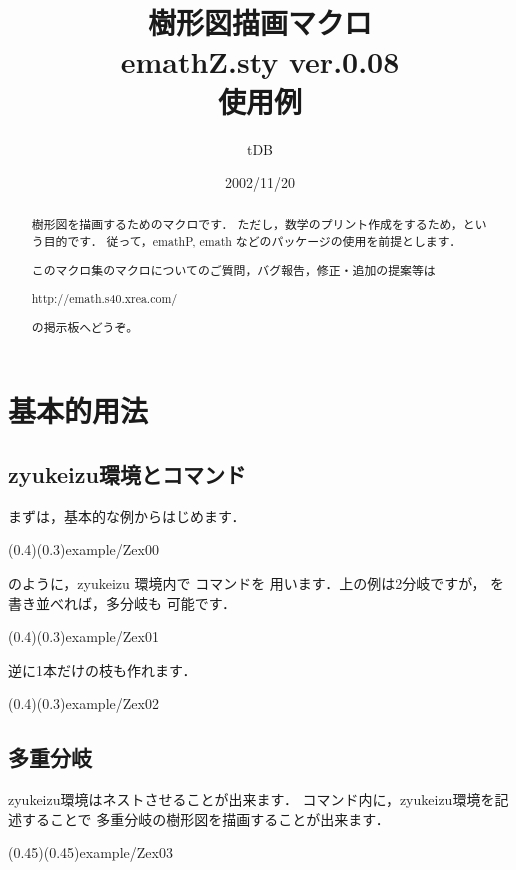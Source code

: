 \documentclass[a4j]{jarticle}
\begin{document}
\title{樹形図描画マクロ\\
emathZ.sty {\normalsize ver.0.08}\\使用例}
\author{tDB}
\date{2002/11/20}

\maketitle\thispagestyle{empty}
\begin{abstract}%
\zw%
樹形図を描画するためのマクロです．
ただし，数学のプリント作成をするため，という目的です．
従って，emathP, emath などのパッケージの使用を前提とします．

このマクロ集のマクロについてのご質問，バグ報告，修正・追加の提案等は
\begin{center}
http://emath.s40.xrea.com/
\end{center}
の掲示板へどうぞ。
\end{abstract}
\pagebreak
{}%

\tableofcontents

\pagebreak


\section{基本的用法}
\subsection{\textsf{zyukeizu}環境とコマンド}
まずは，基本的な例からはじめます．

\showexample[基本例](0.4)(0.3){example/Zex00}

\noindent のように，\textsf{zyukeizu} 環境内で  コマンドを
用います．上の例は2分岐ですが， を書き並べれば，多分岐も
可能です．

\showexample[多分岐](0.4)(0.3){example/Zex01}

逆に1本だけの枝も作れます．

\showexample[一分岐](0.4)(0.3){example/Zex02}
\clearpage

\subsection{多重分岐}
\textsf{zyukeizu}環境はネストさせることが出来ます．
コマンド内に，\textsf{zyukeizu}環境を記述することで
多重分岐の樹形図を描画することが出来ます．

\showexample[多重分岐](0.45)(0.45){example/Zex03}
\clearpage
\end{document}
